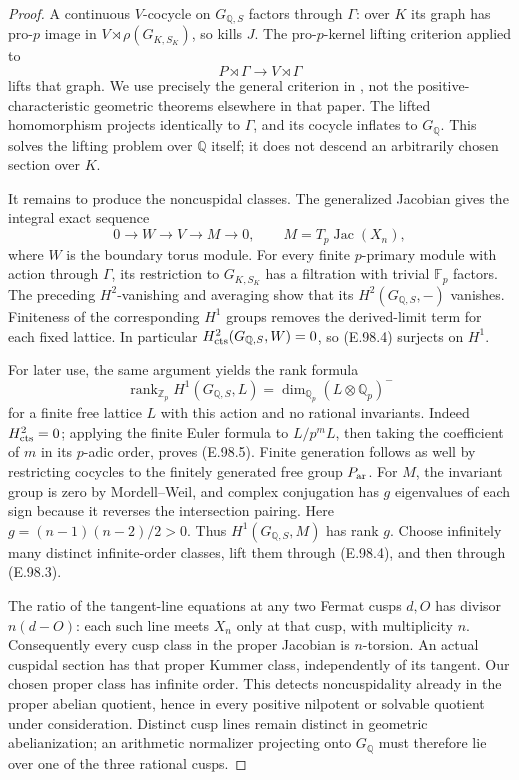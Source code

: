 \begin{proof}
A continuous \(V\)-cocycle on \(G_{\mathbb Q,S}\) factors through
\(\Gamma\): over \(K\) its graph has pro-\(p\) image in
\(V\rtimes\rho(G_{K,S_K})\), so kills \(J\).
The pro-\(p\)-kernel lifting criterion applied to
\[
 P\rtimes\Gamma\longrightarrow V\rtimes\Gamma
                                                               \tag{E.98.3}
\]
lifts that graph.  We use precisely the general criterion in
\citet[Proposition 4.3, p.~149]{LitPachecoStevenson2000}, not the
positive-characteristic geometric theorems elsewhere in that paper.
The lifted homomorphism projects identically to \(\Gamma\), and its
cocycle inflates to \(G_{\mathbb Q}\).  This solves the lifting
problem over \(\mathbb Q\) itself; it does not descend an arbitrarily
chosen section over \(K\).

It remains to produce the noncuspidal classes.  The generalized
Jacobian gives the integral exact sequence
\[
 0\longrightarrow W\longrightarrow V\longrightarrow M
 \longrightarrow0,
 \qquad M=T_p\operatorname{Jac}(X_n),                    \tag{E.98.4}
\]
where \(W\) is the boundary torus module.  For every finite
\(p\)-primary module with action through \(\Gamma\), its restriction
to \(G_{K,S_K}\) has a filtration with trivial \(\mathbb F_p\)
factors.  The preceding \(H^2\)-vanishing and averaging show that its
\(H^2(G_{\mathbb Q,S},-)\) vanishes.  Finiteness of the corresponding
\(H^1\) groups removes the derived-limit term for each fixed lattice.
In particular \(H^2_{\rm cts}(G_{\mathbb Q,S},W)=0\), so (E.98.4)
surjects on \(H^1\).

For later use, the same argument yields the rank formula
\[
 \operatorname{rank}_{\mathbb Z_p}H^1(G_{\mathbb Q,S},L)
       =\dim_{\mathbb Q_p}(L\otimes\mathbb Q_p)^-        \tag{E.98.5}
\]
for a finite free lattice \(L\) with this action and no rational
invariants.  Indeed \(H^2_{\rm cts}=0\); applying the finite Euler
formula to \(L/p^mL\), then taking the coefficient of \(m\) in its
\(p\)-adic order, proves (E.98.5).  Finite generation follows as
well by restricting cocycles to the finitely generated free group
\(P_{\rm ar}\).  For \(M\), the invariant group is zero by
Mordell--Weil, and complex conjugation has \(g\) eigenvalues of each
sign because it reverses the intersection pairing.  Here
\(g=(n-1)(n-2)/2>0\).  Thus \(H^1(G_{\mathbb Q,S},M)\) has rank
\(g\).  Choose infinitely many distinct infinite-order classes,
lift them through (E.98.4), and then through (E.98.3).

The ratio of the tangent-line equations at any two Fermat cusps
\(d,O\) has divisor \(n(d-O)\): each such line meets \(X_n\) only
at that cusp, with multiplicity \(n\).  Consequently every cusp
class in the proper Jacobian is \(n\)-torsion.  An actual cuspidal
section has that proper Kummer class, independently of its tangent.
Our chosen proper class has infinite order.  This detects
noncuspidality already in the proper abelian quotient, hence in
every positive nilpotent or solvable quotient under consideration.
Distinct cusp lines remain distinct in geometric abelianization;
an arithmetic normalizer projecting onto \(G_{\mathbb Q}\) must
therefore lie over one of the three rational cusps.


\end{proof}
